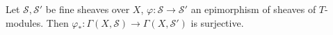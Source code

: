 Let $\mathcal{S}, \mathcal{S}'$ be fine sheaves over $X$, $\varphi: \mathcal{S} \to \mathcal{S}'$ an epimorphism of sheaves of $T$-modules. Then $\varphi_*: \Gamma(X, \mathcal{S}) \to \Gamma(X, \mathcal{S}')$ is surjective.

